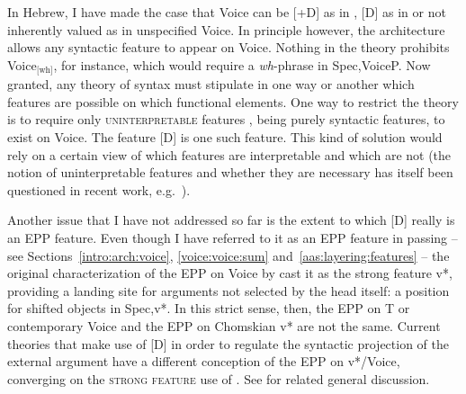 \begin{exe}
\begin{xlist}
\begin{xlist}
\begin{xlist}
\begin{xlist}
\begin{xlist}
\begin{xlist}
\begin{exe}
\begin{xlist}
\begin{exe}
\begin{exe}
\begin{xlist}
\begin{exe}
\begin{exe}
\begin{xlist}
\begin{exe}
\begin{xlist}
\begin{exe}
\begin{xlist}
\begin{exe}
\begin{xlist}
\begin{exe}
\begin{xlist}
In Hebrew, I have made the case that Voice can be [+D] as in {\vd}, [\textminus{}D] as in {\vz} or not inherently valued as in unspecified Voice. In principle however, the architecture allows any syntactic feature to appear on Voice. Nothing in the theory prohibits Voice$_{\text{[wh]}}$, for instance, which would require a \emph{wh}-phrase in Spec,VoiceP. Now granted, any theory of syntax must stipulate in one way or another which features are possible on which functional elements. One way to restrict the theory is to require only \textsc{uninterpretable} features \citep{chomsky95}, being purely syntactic features, to exist on Voice. The  feature [D] is one such feature. This kind of solution would rely on a certain view of which features are interpretable and which are not (the notion of uninterpretable features and whether they are necessary has itself been questioned in recent work, e.g.~\citealt{preminger14mit}).

\label{r1:g:2a2}Another issue that I have not addressed so far is the extent to which [D] really is an EPP feature. Even though I have referred to it as an EPP feature in passing -- see Sections~\ref{intro:arch:voice}, \ref{voice:voice:sum} and~\ref{aas:layering:features} -- the original characterization of the EPP on Voice by \cite{chomsky00,chomsky01} cast it as the strong feature v*, providing a landing site for arguments not selected by the head itself: a position for shifted objects in Spec,v*. In this strict sense, then, the EPP on T or contemporary Voice and the EPP on Chomskian v* are not the same. Current theories that make use of [D] in order to regulate the syntactic projection of the external argument have a different conception of the EPP on v*/Voice, converging on the \textsc{strong feature} use of \cite{adger03}. See \cite{adgersvenonius11} for related general discussion.


\end{xlist}
\end{exe}
\end{xlist}
\end{exe}
\end{xlist}
\end{exe}
\end{xlist}
\end{exe}
\end{xlist}
\end{exe}
\end{exe}
\end{xlist}
\end{exe}
\end{exe}
\end{xlist}
\end{exe}
\end{xlist}
\end{xlist}
\end{xlist}
\end{xlist}
\end{xlist}
\end{xlist}
\end{exe}
